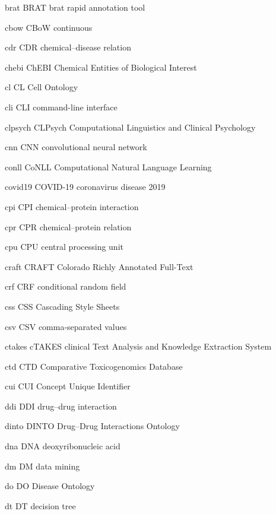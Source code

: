 \newabbreviation
{brat}
{BRAT}
{brat rapid annotation tool}

\newabbreviation
{cbow}
{CBoW}
{continuous }

\newabbreviation
{cdr}
{CDR}
{chemical--disease relation}

\newabbreviation
{chebi}
{ChEBI}
{Chemical Entities of Biological Interest}

\newabbreviation
{cl}
{CL}
{Cell Ontology}

\newabbreviation
{cli}
{CLI}
{command-line interface}

\newabbreviation
{clpsych}
{CLPsych}
{Computational Linguistics and Clinical Psychology}

\newabbreviation
{cnn}
{CNN}
{convolutional neural network}

\newabbreviation
{conll}
{CoNLL}
{Computational Natural Language Learning}

\newabbreviation
{covid19}
{COVID-19}
{coronavirus disease 2019}

\newabbreviation
{cpi}
{CPI}
{chemical--protein interaction}

\newabbreviation
{cpr}
{CPR}
{chemical--protein relation}

\newabbreviation
{cpu}
{CPU}
{central processing unit}

\newabbreviation
{craft}
{CRAFT}
{Colorado Richly Annotated Full-Text}

\newabbreviation
{crf}
{CRF}
{conditional random field}

\newabbreviation
{css}
{CSS}
{Cascading Style Sheets}

\newabbreviation
{csv}
{CSV}
{comma-separated values}

\newabbreviation
{ctakes}
{cTAKES}
{clinical Text Analysis and Knowledge Extraction System}

\newabbreviation
{ctd}
{CTD}
{Comparative Toxicogenomics Database}

\newabbreviation
{cui}
{CUI}
{Concept Unique Identifier}

\newabbreviation
{ddi}
{DDI}
{drug--drug interaction}

\newabbreviation
{dinto}
{DINTO}
{Drug--Drug Interactions Ontology}

\newabbreviation
{dna}
{DNA}
{deoxyribonucleic acid}

\newabbreviation
{dm}
{DM}
{data mining}

\newabbreviation
{do}
{DO}
{Disease Ontology}

\newabbreviation
{dt}
{DT}
{decision tree}

